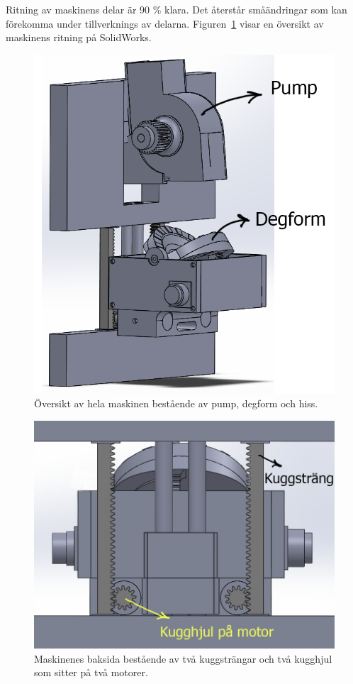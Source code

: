 Ritning av maskinens delar är 90 \% klara. Det återstår småändringar som kan förekomma under tillverknings av delarna. Figuren~\ref{helmaskin} visar en översikt av maskinens ritning på SolidWorks.

\begin{figure}[h]
	\begin{center}
		\includegraphics[scale=0.75]{images/hela_maskin.png}
		\caption{Översikt av hela maskinen bestående av pump, degform och hiss.}
		\label{helmaskin}
	\end{center}
\end{figure}


\begin{figure}[h]
	\begin{center}
		\includegraphics[scale=0.75]{images/maskinBaksida.jpg}
		\caption{Maskinenes baksida bestående av två kuggsträngar och två kugghjul som sitter på två motorer.}
		\label{helmaskinbaksida}
	\end{center}
\end{figure}
